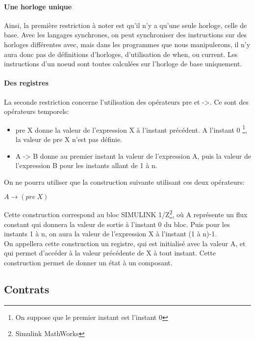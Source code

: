 \paragraph{Une horloge unique}
Ainsi, la première restriction à noter est qu'il n'y a qu'une seule
horloge, celle de base. Avec les langages synchrones, on peut
synchroniser des instructions sur des horloges différentes avec, mais
dans les programmes que nous manipulerons, il n'y aura donc pas de
définitions d'horloges, d'utilisation de when, ou current. Les
instructions d'un noeud sont toutes calculées sur l'horloge de base
uniquement. 

\paragraph{Des registres}
La seconde restriction concerne l'utilisation des opérateurs pre et
->. Ce sont des opérateurs temporels:
\begin{itemize}
\item pre X donne la valeur de l'expression X à l'instant précédent. A
l'instant 0 \footnote{On suppose que le premier instant est l'instant
0}, la valeur de pre X n'est pas définie. 
\item A -> B donne au premier instant la valeur de l'expression A, 
puis la valeur de l'expression B pour les instants allant de 1 à n. 
\end{itemize}
On ne pourra utiliser que la construction suivante utilisant ces deux
opérateurs: 
\begin{center}
$A\rightarrow(pre~X)$
\end{center}
Cette construction correspond au bloc SIMULINK 1/Z\footnote{Simulink MathWorks}, où A représente un
flux constant qui donnera la valeur de sortie à l'instant 0 du
bloc. Puis pour les instants 1 à n, on aura la valeur de l'expression
X à l'instant (1 à n)-1. \\
On appellera cette construction un registre, qui est initialisé avec la
valeur A, et qui permet d'accéder à la valeur précédente de X à tout
instant. Cette construction permet de donner un état à un composant.


\subsection{Contrats}

